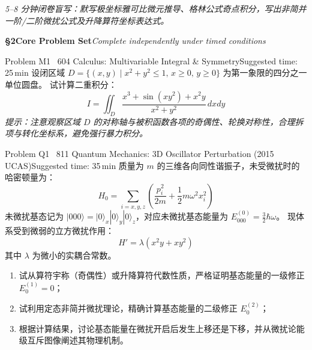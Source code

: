 \documentclass[a4paper,11pt]{article}
\begin{document}
\vspace{4pt}

\begin{tcolorbox}[
  enhanced, colback=white, colframe=border, boxrule=0.6pt, arc=2mm,
  left=4mm, right=4mm, top=3mm, bottom=3mm,
  fonttitle=\sffamily\bfseries\color{slate},
  title={\raisebox{0pt}{\color{royal}\rule{3pt}{10pt}}\hspace{4pt}Warm-Up Retrieval Workspace \textbar\ 白纸破冰与间隔提取草稿区},
  colbacktitle=paper, coltitle=slate,
  titlerule=0pt, toptitle=2mm, bottomtitle=2mm
]
\textcolor{mist}{\footnotesize\itshape 5--8 分钟闭卷盲写：默写极坐标雅可比微元推导、格林公式奇点积分，写出非简并一阶/二阶微扰公式及升降算符坐标表达式。}
\vspace{9.0cm}
\end{tcolorbox}

\clearpage

{\Large\sffamily\bfseries\color{navy} \S 2\quad Core Problem Set}\hfill{\small\sffamily\color{mist}\itshape Complete independently under timed conditions}

\vspace{8pt}

\begin{problem}{Problem M1 \textbar\ 604 Calculus: Multivariable Integral \& Symmetry}{Suggested time: 25\,min}
设闭区域 $D = \{(x,y) \mid x^2 + y^2 \le 1, \, x \ge 0, \, y \ge 0\}$ 为第一象限的四分之一单位圆盘。
试计算二重积分：
\[
  I = \iint_D \frac{x^3 + \sin(x y^2) + x^2 y}{x^2 + y^2}\,dxdy
\]
\textit{提示：注意观察区域 $D$ 的对称轴与被积函数各项的奇偶性、轮换对称性，合理拆项与转化坐标系，避免强行暴力积分。}
\end{problem}

\vspace{6pt}

\begin{problem}{Problem Q1 \textbar\ 811 Quantum Mechanics: 3D Oscillator Perturbation (2015 UCAS)}{Suggested time: 35\,min}
质量为 $m$ 的三维各向同性谐振子，未受微扰时的哈密顿量为：
\[
  H_0 = \sum_{i=x,y,z} \left( \frac{p_i^2}{2m} + \frac{1}{2}m\omega^2 x_i^2 \right)
\]
未微扰基态记为 $|000\rangle = |0\rangle_x |0\rangle_y |0\rangle_z$，对应未微扰基态能量为 $E_{000}^{(0)} = \frac{3}{2}\hbar\omega$。
现体系受到微弱的立方微扰作用：
\[
  H' = \lambda (x^2 y + x y^2)
\]
其中 $\lambda$ 为微小的实耦合常数。
\begin{enumerate}[leftmargin=1.8em, itemsep=2pt, topsep=1pt]
  \item 试从算符宇称（奇偶性）或升降算符代数性质，严格证明基态能量的一级修正 $E_0^{(1)} = 0$；
  \item 试利用定态非简并微扰理论，精确计算基态能量的二级修正 $E_0^{(2)}$；
  \item 根据计算结果，讨论基态能量在微扰开启后发生上移还是下移，并从微扰论能级互斥图像阐述其物理机制。
\end{enumerate}
\end{problem}
\end{document}
